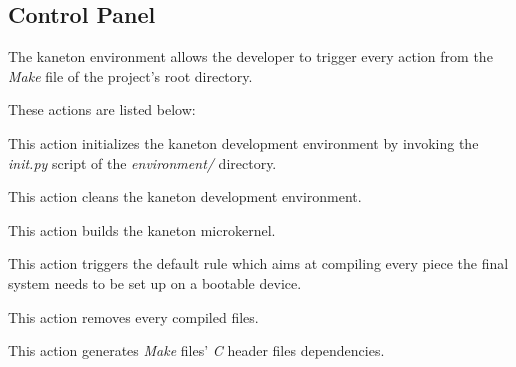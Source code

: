 %
%
%
%
%
%

%
%

\subsection{Control Panel}
\label{section:control panel}

The kaneton environment allows the developer to trigger every action from
the \textit{Make} file of the project's root directory.

These actions are listed below:

        {
	  This action initializes the kaneton development environment by
	  invoking the \textit{init.py} script of the \textit{environment/}
	  directory.

	  \-

	}

	{
	  This action cleans the kaneton development environment.

	  \-

	}

	{
	  This action builds the kaneton microkernel.

	  \-

	}

	{
	  This action triggers the default rule which aims at compiling every
	  piece the final system needs to be set up on a bootable device.

	  \-


	}

	{
	  This action removes every compiled files.

	  \-

	}

	{
	  This action generates \textit{Make} files' \textit{C} header
	  files dependencies.

	  \-

	}

